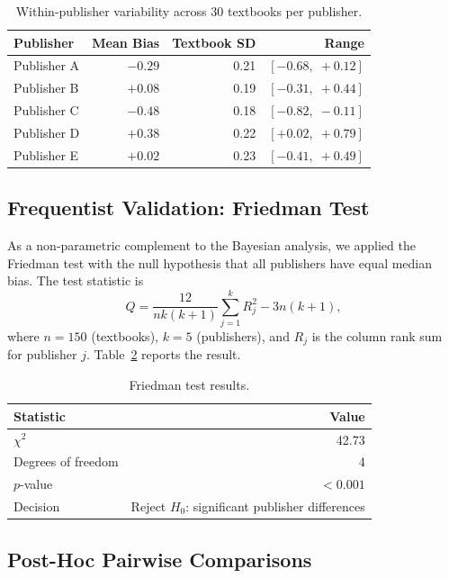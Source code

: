 \documentclass[10pt,letterpaper]{article}
\begin{document}
\begin{table}[h]
\centering
\caption{Within-publisher variability across 30 textbooks per publisher.}
\label{tab:within_pub}
\begin{tabular}{lrrr}
\toprule
\textbf{Publisher} & \textbf{Mean Bias} & \textbf{Textbook SD} & \textbf{Range} \\
\midrule
Publisher A & $-0.29$ & 0.21 & $[-0.68,\;+0.12]$ \\
Publisher B & $+0.08$ & 0.19 & $[-0.31,\;+0.44]$ \\
Publisher C & $-0.48$ & 0.18 & $[-0.82,\;-0.11]$ \\
Publisher D & $+0.38$ & 0.22 & $[+0.02,\;+0.79]$ \\
Publisher E & $+0.02$ & 0.23 & $[-0.41,\;+0.49]$ \\
\bottomrule
\end{tabular}
\end{table}

\subsection{Frequentist Validation: Friedman Test}

As a non-parametric complement to the Bayesian analysis, we applied the Friedman
test with the null hypothesis that all publishers have equal median bias.  The
test statistic is
\begin{equation}
  Q = \frac{12}{nk(k+1)} \sum_{j=1}^{k} R_j^2 - 3n(k+1),
  \label{eq:friedman}
\end{equation}
where $n = 150$ (textbooks), $k = 5$ (publishers), and $R_j$ is the column rank
sum for publisher $j$.  Table~\ref{tab:friedman} reports the result.

\begin{table}[h]
\centering
\caption{Friedman test results.}
\label{tab:friedman}
\begin{tabular}{lr}
\toprule
\textbf{Statistic} & \textbf{Value} \\
\midrule
$\chi^2$              & 42.73   \\
Degrees of freedom    & 4       \\
$p$-value             & $<0.001$ \\
Decision & Reject $H_0$: significant publisher differences \\
\bottomrule
\end{tabular}
\end{table}

\subsection{Post-Hoc Pairwise Comparisons}
\end{document}
